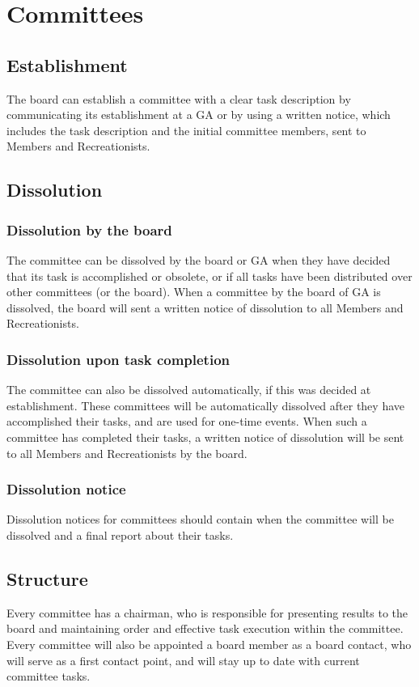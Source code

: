 \documentclass[a4paper]{article}
\begin{document}
\section{Committees}
\subsection{Establishment}
The board can establish a committee with a clear task description by communicating its establishment at a GA or by using a written notice, which includes the task description and the initial committee members, sent to Members and Recreationists.

\subsection{Dissolution}
\subsubsection{Dissolution by the board}
The committee can be dissolved by the board or GA when they have decided that its task is accomplished or obsolete, or if all tasks have been distributed over other committees (or the board). When a committee by the board of GA is dissolved, the board will sent a written notice of dissolution to all Members and Recreationists.

\subsubsection{Dissolution upon task completion}
The committee can also be dissolved automatically, if this was decided at establishment. These committees will be automatically dissolved after they have accomplished their tasks, and are used for one-time events. When such a committee has completed their tasks, a written notice of dissolution will be sent to all Members and Recreationists by the board.

\subsubsection{Dissolution notice}
Dissolution notices for committees should contain when the committee will be dissolved and a final report about their tasks.

\subsection{Structure}
Every committee has a chairman, who is responsible for presenting results to the board and maintaining order and effective task execution within the committee. Every committee will also be appointed a board member as a board contact, who will serve as a first contact point, and will stay up to date with current committee tasks.
\end{document}
